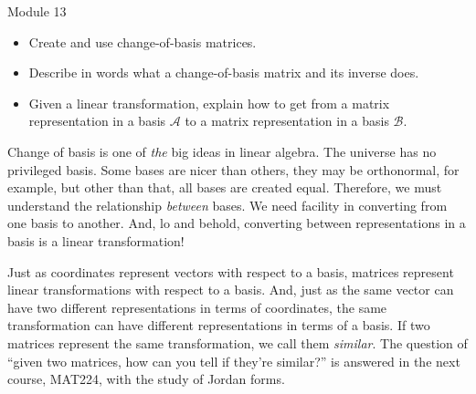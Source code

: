 \begin{lesson}

	Module 13

	\begin{itemize}
		\item Create and use change-of-basis matrices.
		\item Describe in words what a change-of-basis matrix and its inverse does.
		\item Given a linear transformation, explain how to get from a matrix representation in a basis $\mathcal A$
			to a matrix representation in a basis $\mathcal B$.
	\end{itemize}

	Change of basis is one of \emph{the} big ideas in linear algebra. The universe has no
	privileged basis. Some bases are nicer than others, they may be orthonormal, for example, but
	other than that, all bases are created equal. Therefore, we must understand the relationship
	\emph{between} bases. We need facility in converting from one basis to another. And, lo and behold,
	converting between representations in a basis is a linear transformation!

	Just as coordinates represent vectors with respect to a basis, matrices represent
	linear transformations with respect to a basis. And, just as the same vector can
	have two different representations in terms of coordinates, the same transformation
	can have different representations in terms of a basis. If two matrices represent the
	same transformation, we call them \emph{similar}. The question of ``given two
	matrices, how can you tell if they're similar?'' is answered in the next course, MAT224, with
	the study of Jordan forms.

\end{lesson}
	\bookonlynewpage
	\question
